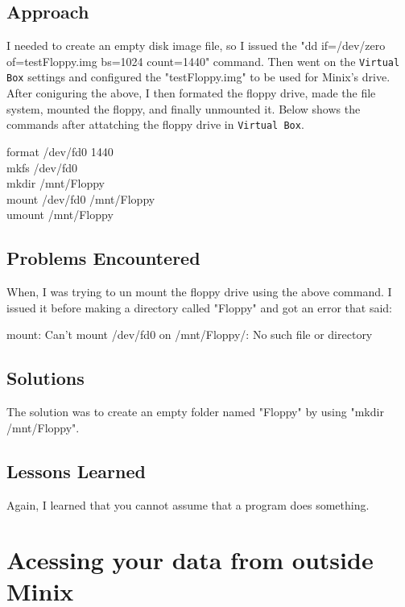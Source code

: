 \documentclass[11pt]{article}
\begin{document}
\subsection{Approach}

  I needed to create an empty disk image file, 
so I issued the "dd if=/dev/zero of=testFloppy.img bs=1024 count=1440" 
command. Then went on the {\tt Virtual Box} settings and configured 
the "testFloppy.img" to be used for Minix's drive. After coniguring the above, 
I then formated the floppy drive, made the file system, mounted the floppy, 
and finally unmounted it. Below shows the commands after attatching the 
floppy drive in {\tt Virtual Box}.

{\tt\begin{tabbing}
format /dev/fd0 1440\\
mkfs /dev/fd0\\
mkdir /mnt/Floppy\\
mount /dev/fd0 /mnt/Floppy\\
umount /mnt/Floppy
\end{tabbing}}

\subsection{Problems Encountered}

  When, I was trying to un mount the floppy drive using the above 
command. I issued it before making a directory called "Floppy" and got an 
error that said:

{\tt\begin{tabbing}
mount: Can't mount /dev/fd0 on /mnt/Floppy/: No such file or directory
\end{tabbing}}

\subsection{Solutions}

The solution was to create an empty folder named "Floppy" by using "mkdir /mnt/Floppy".

\subsection{Lessons Learned}
  Again, I learned that you cannot assume that a program does something.

		
\setcounter{section}{4} %
\section{Acessing your data from outside Minix}
\end{document}
